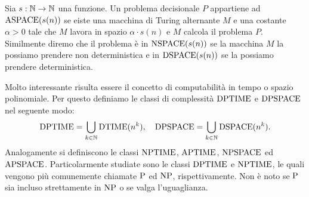\begin{definizione}
 Sia $s:\N\to\N$ una funzione.
 Un problema decisionale $P$ appartiene ad $\ASPACE(s(n))$ se eiste una macchina
 di Turing alternante $M$ e una costante $\alpha>0$ tale che $M$ lavora in spazio
 $\alpha \cdot s(n)$ e $M$ calcola il problema $P$. Similmente diremo che
 il problema è in $\NSPACE(s(n))$ se la macchina $M$ la possiamo prendere non
 deterministica e in $\DSPACE(s(n))$ se la possiamo prendere deterministica.
\end{definizione}

% 
% 

Molto interessante risulta essere il concetto di computabilità in tempo o spazio polinomiale.
Per questo definiamo le classi di complessità $\DPTIME$ e $\DPSPACE$ nel seguente modo:
\[ \DPTIME = \bigcup_{k\in\N} \DTIME(n^k), \quad \DPSPACE = \bigcup_{k\in\N} \DSPACE(n^k). \]
Analogamente si definiscono le classi $\NPTIME$, $\APTIME$, $\NPSPACE$ ed $\APSPACE$.
Particolarmente studiate sono le classi $\DPTIME$ e $\NPTIME$, le quali vengono più comunemente chiamate $\P$ ed $\NP$, rispettivamente.
Non è noto se $\P$ sia incluso strettamente in $\NP$ o se valga l'uguaglianza.

